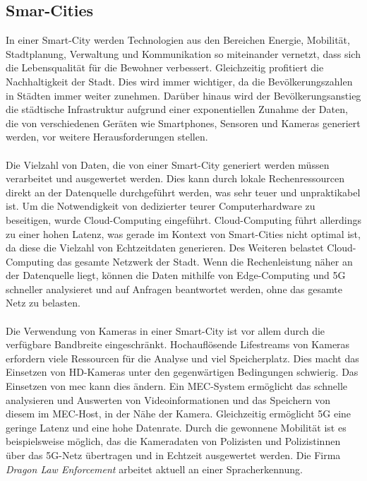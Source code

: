 \documentclass[runningheads]{llncs}
\numberwithin{figure}{section}
\begin{document}
\subsection{Smar-Cities}
\label{subsec:Smart Cities}
In einer Smart-City werden Technologien aus den Bereichen Energie, Mobilität, Stadtplanung, 
Verwaltung und Kommunikation so miteinander vernetzt, dass sich die Lebensqualität für die Bewohner verbessert. 
Gleichzeitig profitiert die Nachhaltigkeit der Stadt. Dies wird immer wichtiger, da die Bevölkerungszahlen in 
Städten immer weiter zunehmen.
Darüber hinaus wird der Bevölkerungsanstieg die städtische Infrastruktur aufgrund einer 
exponentiellen Zunahme der Daten, die von verschiedenen Geräten wie Smartphones, Sensoren und Kameras generiert werden, 
vor weitere Herausforderungen stellen. 
\\
\\
Die Vielzahl von Daten, die von einer Smart-City generiert werden müssen verarbeitet und ausgewertet werden. Dies kann durch lokale Rechenressourcen
direkt an der Datenquelle durchgeführt werden, was sehr teuer und unpraktikabel ist. 
Um die Notwendigkeit von dedizierter teurer Computerhardware zu beseitigen, wurde Cloud-Computing eingeführt. Cloud-Computing führt allerdings
zu einer hohen Latenz, was gerade im Kontext von Smart-Cities nicht optimal ist, da diese die Vielzahl von Echtzeitdaten generieren.
Des Weiteren belastet Cloud-Computing das gesamte Netzwerk der Stadt. 
Wenn die Rechenleistung näher an der Datenquelle liegt, können die Daten mithilfe von Edge-Computing und 5G schneller analysieret
und auf Anfragen beantwortet werden, ohne das gesamte Netz zu belasten.
\\
\\
Die Verwendung von Kameras in einer Smart-City ist vor allem durch die verfügbare Bandbreite eingeschränkt. 
Hochauflösende Lifestreams von Kameras erfordern viele Ressourcen für die Analyse und viel Speicherplatz. 
Dies macht das Einsetzen von HD-Kameras unter den gegenwärtigen Bedingungen schwierig.
Das Einsetzen von \acrlong{mec} kann dies ändern. Ein MEC-System ermöglicht das schnelle analysieren und Auswerten von
Videoinformationen und das Speichern von diesem im MEC-Host, in der Nähe der Kamera. Gleichzeitig ermöglicht 5G eine geringe Latenz und eine 
hohe Datenrate. Durch die gewonnene Mobilität ist es beispielsweise möglich, das die Kameradaten von Polizisten und Polizistinnen über das 5G-Netz
übertragen und in Echtzeit ausgewertet werden. Die Firma \textit{Dragon Law Enforcement} arbeitet aktuell an einer Spracherkennung.
\end{document}
